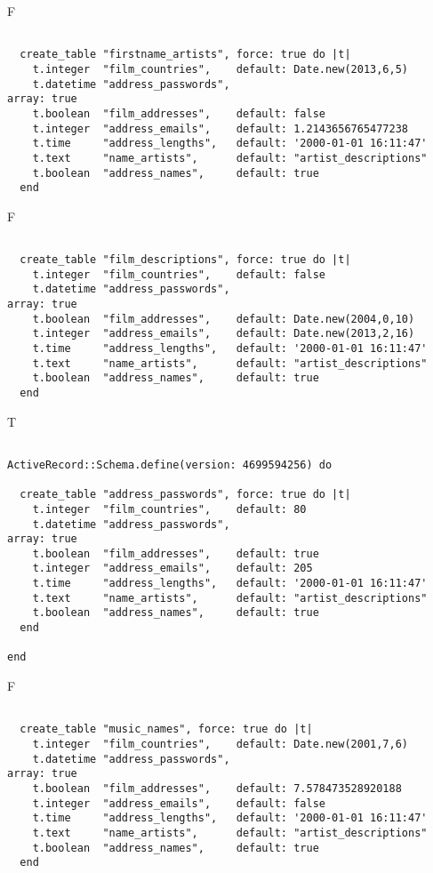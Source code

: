 F
\begin{verbatim}

  create_table "firstname_artists", force: true do |t|
    t.integer  "film_countries",    default: Date.new(2013,6,5)
    t.datetime "address_passwords",                                 array: true
    t.boolean  "film_addresses",    default: false
    t.integer  "address_emails",    default: 1.2143656765477238
    t.time     "address_lengths",   default: '2000-01-01 16:11:47'
    t.text     "name_artists",      default: "artist_descriptions"
    t.boolean  "address_names",     default: true
  end

\end{verbatim}

F
\begin{verbatim}

  create_table "film_descriptions", force: true do |t|
    t.integer  "film_countries",    default: false
    t.datetime "address_passwords",                                 array: true
    t.boolean  "film_addresses",    default: Date.new(2004,0,10)
    t.integer  "address_emails",    default: Date.new(2013,2,16)
    t.time     "address_lengths",   default: '2000-01-01 16:11:47'
    t.text     "name_artists",      default: "artist_descriptions"
    t.boolean  "address_names",     default: true
  end

\end{verbatim}

T
\begin{verbatim}

ActiveRecord::Schema.define(version: 4699594256) do

  create_table "address_passwords", force: true do |t|
    t.integer  "film_countries",    default: 80
    t.datetime "address_passwords",                                 array: true
    t.boolean  "film_addresses",    default: true
    t.integer  "address_emails",    default: 205
    t.time     "address_lengths",   default: '2000-01-01 16:11:47'
    t.text     "name_artists",      default: "artist_descriptions"
    t.boolean  "address_names",     default: true
  end

end
\end{verbatim}


F
\begin{verbatim}

  create_table "music_names", force: true do |t|
    t.integer  "film_countries",    default: Date.new(2001,7,6)
    t.datetime "address_passwords",                                 array: true
    t.boolean  "film_addresses",    default: 7.578473528920188
    t.integer  "address_emails",    default: false
    t.time     "address_lengths",   default: '2000-01-01 16:11:47'
    t.text     "name_artists",      default: "artist_descriptions"
    t.boolean  "address_names",     default: true
  end

\end{verbatim}

